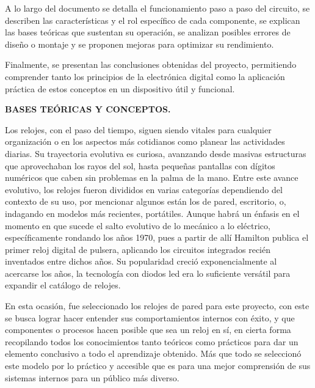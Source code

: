 \documentclass[12pt,letterpaper]{article}
\begin{document}
\indent A lo largo del documento se detalla el funcionamiento paso a paso del circuito, se describen las características y el rol específico de cada componente, se explican las bases teóricas que sustentan su operación, se analizan posibles errores de diseño o montaje y se proponen mejoras para optimizar su rendimiento. 

\indent Finalmente, se presentan las conclusiones obtenidas del proyecto, permitiendo comprender tanto los principios de la electrónica digital como la aplicación práctica de estos conceptos en un dispositivo útil y funcional.

\pagebreak

\textbf{BASES TEÓRICAS Y CONCEPTOS.}

\indent Los relojes, con el paso del tiempo, siguen siendo vitales para cualquier organización o en los aspectos más cotidianos como planear las actividades diarias. Su trayectoria evolutiva es curiosa, avanzando desde masivas estructuras que aprovechaban los rayos del sol, hasta pequeñas pantallas con dígitos numéricos que caben sin problemas en la palma de la mano. Entre este avance evolutivo, los relojes fueron divididos en varias categorías dependiendo del contexto de su uso, por mencionar algunos están los de pared, escritorio, o, indagando en modelos más recientes, portátiles. Aunque habrá un énfasis en el momento en que sucede el salto evolutivo de lo mecánico a lo eléctrico, específicamente rondando los años 1970, pues a partir de allí Hamilton publica el primer reloj digital de pulsera, aplicando los circuitos integrados recién inventados entre dichos años. Su popularidad creció exponencialmente al acercarse los años, la tecnología con diodos led era lo suficiente versátil para expandir el catálogo de relojes.

\indent En esta ocasión, fue seleccionado los relojes de pared para este proyecto, con este se busca lograr hacer entender sus comportamientos internos con éxito, y que componentes o procesos hacen posible que sea un reloj en sí, en cierta forma recopilando todos los conocimientos tanto teóricos como prácticos para dar un elemento conclusivo a todo el aprendizaje obtenido. Más que todo se seleccionó este modelo por lo práctico y accesible que es para una mejor comprensión de sus sistemas internos para un público más diverso.
\end{document}
